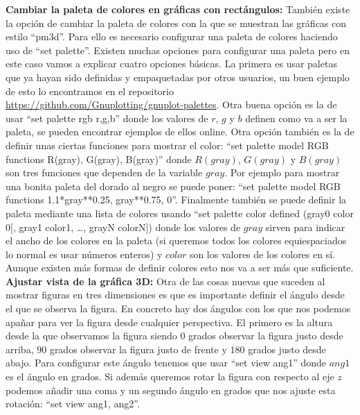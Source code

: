 \documentclass[11pt,a4paper,twoside,pdf]{article}
\numberwithin{equation}{section}
\begin{document}
\textbf{Cambiar la paleta de colores en gráficas con rectángulos:} También existe la opción de cambiar la paleta de colores con la que se muestran las gráficas con estilo ``pm3d''. Para ello es necesario configurar una paleta de colores haciendo uso de ``set palette''. Existen muchas opciones para configurar una paleta pero en este caso vamos a explicar cuatro opciones básicas. La primera es usar paletas que ya hayan sido definidas y empaquetadas por otros usuarios, un buen ejemplo de esto lo encontramos en el repositorio \url{https://github.com/Gnuplotting/gnuplot-palettes}. Otra buena opción es la de usar ``set palette rgb r,g,b'' donde los valores de $r$, $g$ y $b$ definen como va a ser la paleta, se pueden encontrar ejemplos de ellos online. Otra opción también es la de definir unas ciertas funciones para mostrar el color: ``set palette model RGB functions R(gray), G(gray), B(gray)'' donde $R(gray)$, $G(gray)$ y $B(gray)$ son tres funciones que dependen de la variable  $gray$. Por ejemplo para mostrar una bonita paleta del dorado al negro se puede poner: ``set palette model RGB functions 1.1*gray**0.25, gray**0.75, 0''. Finalmente también se puede definir la paleta mediante una lista de colores usando ``set palette color defined (gray0 color 0[, gray1 color1, \ldots, grayN colorN]) donde los valores de $gray$ sirven para indicar el ancho de los colores en la paleta (si queremos todos los colores equiespaciados lo normal es usar números enteros) y $color$ son los valores de los colores en sí. Aunque existen más formas de definir colores esto nos va a ser más que suficiente. \\

\textbf{Ajustar vista de la gráfica 3D:} Otra de las cosas nuevas que suceden al mostrar figuras en tres dimensiones es que es importante definir el ángulo desde el que se observa la figura. En concreto hay dos ángulos con los que nos podemos apañar para ver la figura desde cualquier perspectiva. El primero es la altura desde la que observamos la figura siendo $0$ grados observar la figura justo desde arriba, $90$ grados observar la figura justo de frente y $180$ grados justo desde abajo. Para configurar este ángulo tenemos que usar ``set view ang1'' donde $ang1$ es el ángulo en grados. Si además queremos rotar la figura con respecto al eje $z$ podemos añadir una coma y un segundo ángulo en grados que nos ajuste esta rotación: ``set view ang1, ang2''. \\
\end{document}
